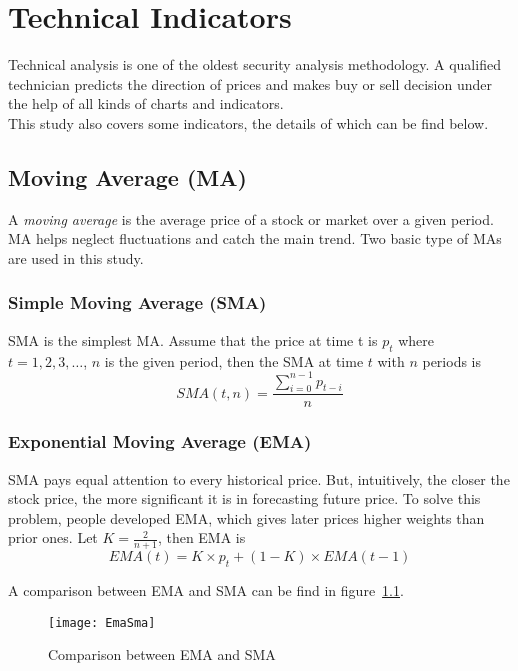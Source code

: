 \chapter{Technical Indicators}
\label{append:technical_indicator}

Technical analysis is one of the oldest security analysis methodology. A qualified technician predicts the direction of prices and makes buy or sell decision under the help of all kinds of charts and indicators.\\

This study also covers some indicators, the details of which can be find below.

\section{Moving Average (MA)}
A \textit{moving average} is the average price of a stock or market over a given period. MA helps neglect fluctuations and catch the main trend\cite[p.~31]{kahn2006technical}. Two basic type of MAs are used in this study.

\subsection{Simple Moving Average (SMA)}
SMA is the simplest MA. Assume that the price at time t is $ p_t $ where $t=1,2,3,\ldots$, $n$ is the given period, then the SMA at time $ t $ with $ n $ periods is
\begin{equation}
SMA(t, n)=\frac{\sum_{i=0}^{n-1}p_{t-i}}{n}
\end{equation}

\subsection{Exponential Moving Average (EMA)}  
SMA pays equal attention to every historical price. But, intuitively, the closer the stock price, the more significant it is in forecasting future price. To solve this problem, people developed EMA, which gives later prices higher weights than prior ones\cite[p.~59--60]{kahn2006technical}. Let $ K =\frac{2}{n+1} $, then EMA is 
\begin{equation}
EMA(t) = K\times p_t+(1-K) \times EMA(t-1)
\end{equation}

A comparison between EMA and SMA can be find in figure~\ref{fg:smaema}.
\begin{figure}[h]
	\centering
	\texttt{[image: EmaSma]}
	\caption{Comparison between EMA and SMA\cite{9_sma_ema}}
	\label{fg:smaema}
\end{figure}

